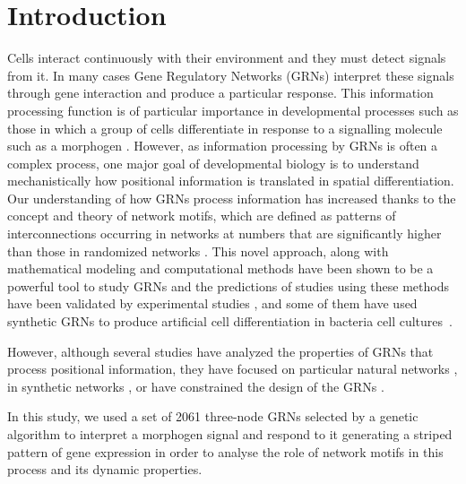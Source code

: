\documentclass[10pt,letterpaper]{article}
\begin{document}
\linenumbers

\section*{Introduction}

Cells interact continuously with their environment and they must detect signals
from it. In many cases Gene Regulatory Networks (GRNs) interpret these signals
through gene interaction and produce a particular response. This information
processing function is of particular importance in developmental processes such
as those in which a group of cells differentiate in response to a signalling
molecule such as a morphogen \cite{Turing1952, Wolpert1969}. However, as
information processing by GRNs is often a complex process, one major goal of
developmental biology is to understand mechanistically how positional
information is translated in spatial differentiation.\\

Our understanding of how GRNs process information has increased thanks to the
concept and theory of network motifs, which are defined as patterns of
interconnections occurring in networks at numbers that are significantly higher
than those in randomized networks \cite{Milo2002}. This novel approach, along
with mathematical modeling and computational methods have been shown to be a
powerful tool to study GRNs and the predictions of studies using these methods
have been validated by experimental studies
\cite{Kalir2005,Kalir2004,Mangan2003a,ODonnell2005}, and some of them 
have used synthetic GRNs to produce artificial cell differentiation in bacteria
cell cultures~\cite{Basu2005}.

However, although several studies have analyzed the properties of GRNs that
process positional information, they have focused on particular natural networks
\cite{Schaerli2014,Jaeger2004}, in synthetic networks
\cite{Basu2005,Reinitz1995,Schaerli2018}, or have constrained the design of the
GRNs \cite{Elowitz2000}.

In this study, we used a set of 2061 three-node GRNs selected by a genetic
algorithm to interpret a morphogen signal and respond to it generating a
striped pattern of gene expression in order to analyse the role of network 
motifs in this process and its dynamic properties.

\end{document}
